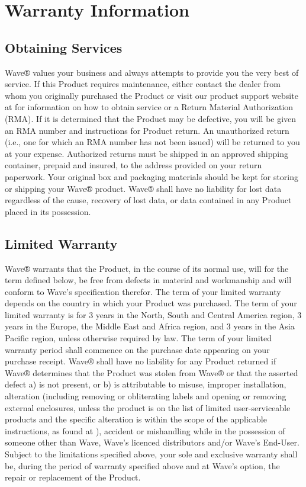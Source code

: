\documentclass[letterpaper,10pt,openany,oneside,english]{sphinxmanual}
\begin{document}
\section{Warranty Information}
\label{\detokenize{warranty:warranty-information}}

\subsection{Obtaining Services}
\label{\detokenize{warranty:obtaining-services}}
Wave® values your business and always attempts to provide you the very best of service. If this Product requires maintenance, either contact the dealer from whom you originally purchased the Product or visit our product support website at  for information on how to obtain service or a Return Material Authorization (RMA). If it is determined that the Product may be defective, you will be given an RMA number and instructions for Product return. An unauthorized return (i.e., one for which an RMA number has not been issued) will be returned to you at your expense. Authorized returns must be shipped in an approved shipping container, prepaid and insured, to the address provided on your return paperwork. Your original box and packaging materials should be kept for storing or shipping your Wave® product.  Wave® shall have no liability for lost data regardless of the cause, recovery of lost data, or data contained in any Product placed in its possession.


\subsection{Limited Warranty}
\label{\detokenize{warranty:limited-warranty}}
Wave® warrants that the Product, in the course of its normal use, will for the term defined below, be free from defects in material and workmanship and will conform to Wave’s specification therefor. The term of your limited warranty depends on the country in which your Product was purchased. The term of your limited warranty is for 3 years in the North, South and Central America region, 3 years in the Europe, the Middle East and Africa region, and 3 years in the Asia Pacific region, unless otherwise required by law. The term of your limited warranty period shall commence on the purchase date appearing on your purchase receipt. Wave® shall have no liability for any Product returned if Wave® determines that the Product was stolen from Wave® or that the asserted defect a) is not present, or b) is attributable to misuse, improper installation, alteration (including removing or obliterating labels and opening or removing external enclosures, unless the product is on the list of limited user-serviceable products and the specific alteration is within the scope of the applicable instructions, as found at ), accident or mishandling while in the possession of someone other than Wave, Wave’s licenced distributors and/or Wave’s End-User. Subject to the limitations specified above, your sole and exclusive warranty shall be, during the period of warranty specified above and at Wave’s option, the repair or replacement of the Product.
\end{document}
